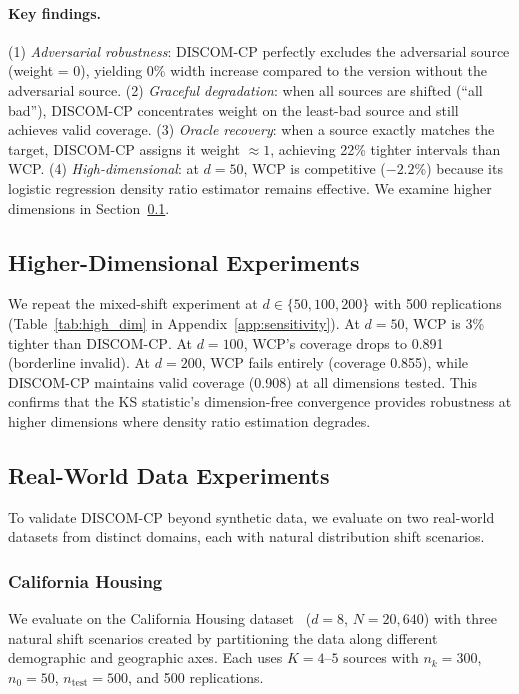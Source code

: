\documentclass{article}
\newcommand{\DISCOM}{\textsc{DISCOM-CP}}
\begin{document}
\paragraph{Key findings.}
(1) \emph{Adversarial robustness}: \DISCOM{} perfectly excludes the adversarial source (weight = 0), yielding 0\% width increase compared to the version without the adversarial source. (2) \emph{Graceful degradation}: when all sources are shifted (``all bad''), \DISCOM{} concentrates weight on the least-bad source and still achieves valid coverage. (3) \emph{Oracle recovery}: when a source exactly matches the target, \DISCOM{} assigns it weight $\approx 1$, achieving 22\% tighter intervals than WCP. (4) \emph{High-dimensional}: at $d = 50$, WCP is competitive ($-2.2$\%) because its logistic regression density ratio estimator remains effective. We examine higher dimensions in Section~\ref{sec:high_dim}.

\subsection{Higher-Dimensional Experiments}
\label{sec:high_dim}

We repeat the mixed-shift experiment at $d \in \{50, 100, 200\}$ with 500 replications (Table~\ref{tab:high_dim} in Appendix~\ref{app:sensitivity}). At $d = 50$, WCP is 3\% tighter than \DISCOM{}. At $d = 100$, WCP's coverage drops to 0.891 (borderline invalid). At $d = 200$, WCP fails entirely (coverage 0.855), while \DISCOM{} maintains valid coverage (0.908) at all dimensions tested. This confirms that the KS statistic's dimension-free convergence provides robustness at higher dimensions where density ratio estimation degrades.

\subsection{Real-World Data Experiments}
\label{sec:real_world}

To validate \DISCOM{} beyond synthetic data, we evaluate on two real-world datasets from distinct domains, each with natural distribution shift scenarios.

\subsubsection{California Housing}
\label{sec:real_california}

We evaluate on the California Housing dataset~\citep{pace1997sparse} ($d = 8$, $N = 20{,}640$) with three natural shift scenarios created by partitioning the data along different demographic and geographic axes. Each uses $K = 4$--$5$ sources with $n_k = 300$, $n_0 = 50$, $n_{\text{test}} = 500$, and 500 replications.
\end{document}
